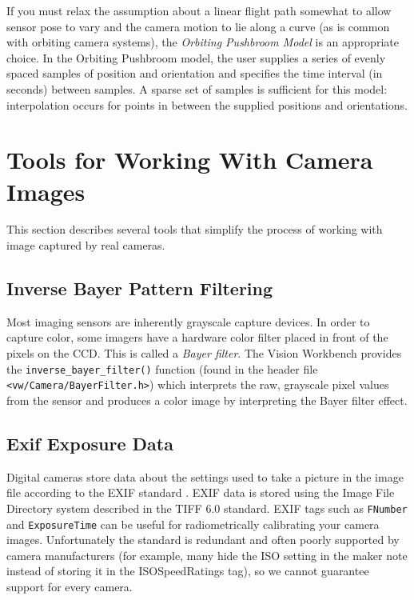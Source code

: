 If you must relax the assumption about a linear flight path somewhat
to allow sensor pose to vary and the camera motion to lie along a
curve (as is common with orbiting camera systems), the {\em Orbiting
  Pushbroom Model} is an appropriate choice.  In the Orbiting
Pushbroom model, the user supplies a series of evenly spaced samples
of position and orientation and specifies the time interval (in
seconds) between samples.  A sparse set of samples is sufficient for
this model: interpolation occurs for points in between the supplied
positions and orientations.

\section{Tools for Working With Camera Images}

This section describes several tools that simplify the process of
working with image captured by real cameras.

\subsection{Inverse Bayer Pattern Filtering}

Most imaging sensors are inherently grayscale capture devices.  In
order to capture color, some imagers have a hardware color filter
placed in front of the pixels on the CCD.  This is called a 
{\em Bayer filter}.  The Vision Workbench provides the
\verb#inverse_bayer_filter()# function (found in the header file
\verb#<vw/Camera/BayerFilter.h>#) which interprets the raw, grayscale
pixel values from the sensor and produces a color image by
interpreting the Bayer filter effect.

\subsection{Exif Exposure Data}

Digital cameras store data about the settings used to take a picture
in the image file according to the EXIF standard \cite{exif}. EXIF
data is stored using the Image File Directory system described in the
TIFF 6.0 standard.  EXIF tags such as {\tt FNumber} and
{\tt ExposureTime} can be useful for radiometrically calibrating your
camera images.  Unfortunately the standard is redundant and often
poorly supported by camera manufacturers (for example, many hide the
ISO setting in the maker note instead of storing it in the
ISOSpeedRatings tag), so we cannot guarantee support for every camera.

